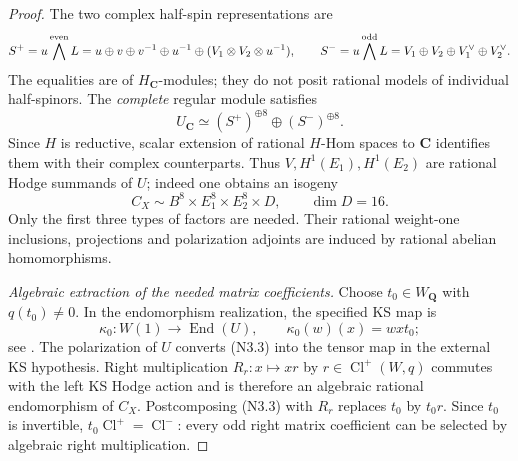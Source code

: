 \documentclass[11pt,reqno]{article}
\theoremstyle{emphasizedplain}
\theoremstyle{emphasizeddefinition}
\theoremstyle{emphasizeddefinition}
\DeclareMathOperator{\End}{End}
\newcommand{\Q}{\mathbf Q}
\newcommand{\C}{\mathbf C}
\begin{document}
\begin{proof}
The two complex half-spin representations are
\[
 S^+=u\bigwedge^{\rm even}L
  =u\oplus v\oplus v^{-1}\oplus u^{-1}
      \oplus(V_1\otimes V_2\otimes u^{-1}),
\qquad
 S^-=u\bigwedge^{\rm odd}L
  =V_1\oplus V_2\oplus V_1^\vee\oplus V_2^\vee.
\]
The equalities are of $H_\C$-modules; they do not posit rational
models of individual half-spinors. The \emph{complete} regular module
satisfies
\[
 U_\C\simeq(S^+)^{\oplus8}\oplus(S^-)^{\oplus8}.
\]
Since $H$ is reductive, scalar extension of rational $H$-Hom
spaces to $\C$ identifies them with their complex counterparts.
Thus $V,H^1(E_1),H^1(E_2)$ are rational Hodge summands of $U$;
indeed one obtains an isogeny
\[
               C_X\sim B^8\times E_1^8\times E_2^8\times D,
               \qquad\dim D=16.                       \tag{N3.2}
\]
Only the first three types of factors are needed. Their rational
weight-one inclusions, projections and polarization adjoints are
induced by rational abelian homomorphisms.

\emph{Algebraic extraction of the needed matrix coefficients.}
Choose $t_0\in W_\Q$ with $q(t_0)\ne0$. In the endomorphism
realization, the specified KS map is
\[
 \kappa_0:W(1)\longrightarrow\End(U),\qquad
 \kappa_0(w)(x)=wxt_0;
                                                        \tag{N3.3}
\]
see \cite[Chapter 4, Proposition 2.6 and Remark 2.7]{HuybrechtsK3}.
The polarization of $U$ converts (N3.3) into the tensor map in the
external KS hypothesis. Right multiplication $R_r:x\mapsto xr$ by
$r\in\operatorname{Cl}^+(W,q)$ commutes with the left KS Hodge
action and is therefore an algebraic rational endomorphism of $C_X$.
Postcomposing (N3.3) with $R_r$ replaces $t_0$ by $t_0r$.
Since $t_0$ is invertible, $t_0\operatorname{Cl}^+=\operatorname{Cl}^-$:
every odd right matrix coefficient can be selected by algebraic
right multiplication.


\end{proof}
\end{document}
